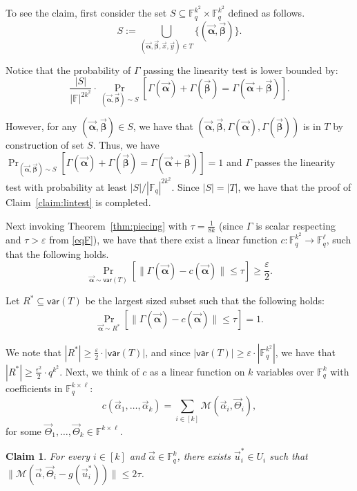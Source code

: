 \documentclass[10pt,a4paper]{article}
\newcommand{\F}{\mathbb{F}}
\renewcommand{\ge}{ \geqslant}
\renewcommand{\le}{ \leqslant}
\newtheorem{claim}[theorem]{Claim}
\newcommand{\alphab}{\vec{\bm{\alpha}}}
\newcommand{\betab}{\vec{\bm{\beta}}}
\newcommand{\var}{\mathsf{var}}
\renewcommand{\kappa}{\tau}
\newcommand{\M}{\mathcal{M}}
\begin{document}
To see the claim, first consider the set $S\subseteq \F_q^{k^2}\times \F_q^{k^2}$ defined as follows.
$$
S:=\underset{(\alphab,\betab,\vec{x},\vec{y})\in T}{\bigcup}\{(\alphab,\betab)\}.
$$  

Notice that the probability of $\Gamma$ passing the linearity test is lower bounded by:
$$
\frac{|S|}{|\F|^{2k^2}}\cdot \Pr_{(\vec{\bm{\alpha}},\vec{\bm{\beta}})\sim S}\left[\Gamma(\vec{\bm{\alpha}})+\Gamma(\vec{\bm{\beta}})=\Gamma(\vec{\bm{\alpha}}+\vec{\bm{\beta}})\right].
$$
 
However, for any $(\alphab,\betab)\in S$, we have that $(\alphab,\betab,\Gamma(\alphab),\Gamma(\betab))$ is in $T$ by construction of set $S$.  Thus, we have $\Pr_{(\vec{\bm{\alpha}},\vec{\bm{\beta}})\sim S}\left[\Gamma(\vec{\bm{\alpha}})+\Gamma(\vec{\bm{\beta}})=\Gamma(\vec{\bm{\alpha}}+\vec{\bm{\beta}})\right]=1$ and $\Gamma$ passes the linearity test with probability at least $|S|/|\F_q|^{2k^2}$. Since $|S|=|T|$, we have that the proof of Claim~\ref{claim:lintest} is completed. 
	



Next invoking Theorem~\ref{thm:piecing} with $\kappa=\frac{1}{8k}$ (since $\Gamma$ is scalar respecting and $\kappa> \varepsilon$ from \eqref{eqF}), we have that there exist a linear function $c:\F_q^{k^2}\to\F_q^{\ell}$, such that the following holds.
$$
\underset{\vec{\bm{\alpha}}\sim \var(T) }{\Pr}\left[\|\Gamma(\vec{\bm{\alpha}})-c(\vec{\bm{\alpha}})\|\le \kappa  \right]\ge \frac{\varepsilon}{2}.
$$ 

Let $R^\ast\subseteq \var(T)$ be the largest sized subset such that the following holds:
\begin{align}
\underset{\vec{\bm{\alpha}}\sim R^\ast }{\Pr}\left[\|\Gamma(\vec{\bm{\alpha}})-c(\vec{\bm{\alpha}})\|\le \kappa  \right]=1
.\label{eq:lin1}
\end{align}

We note that $|R^\ast|\ge \frac{\varepsilon}{2}\cdot |\var(T)|$, and since $|\var(T)|\ge \varepsilon\cdot |\F_q^{k^2}|$, we have that $|R^\ast|\ge \frac{\varepsilon^2}{2}\cdot q^{k^2}$.  
Next, we think of $c$ as a linear function on $k$ variables over $\F_q^k$ with coefficients  in $\F_q^{k\times \ell}$:
$$c(\vec{\alpha}_1,\ldots ,\vec{\alpha}_k)=\sum_{i\in[k]}\M(\vec{\alpha}_i,\vec{\Theta}_i ),$$ 
for some $\vec{\Theta}_1 ,\ldots ,\vec{\Theta}_k \in\mathbb{F}^{k\times \ell}$.


\begin{claim}\label{claim:decodespecificalpha}
For every $i\in[k]$ and $\vec{\alpha}\in\F_q^k$, there exists $\vec{u}_i^\ast\in U_i$  such that $\|\M(  \vec{\alpha},\vec{\Theta}_i-g(\vec{u}_i^\ast)) \|\le 2\kappa$.
\end{claim}
\end{document}
